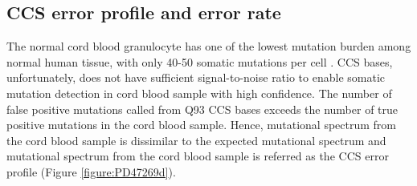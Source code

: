 
\subsection{CCS error profile and error rate}
\label{sec:CCS-error-rate}

The normal cord blood granulocyte has one of the lowest mutation burden among normal human tissue, with only 40-50 somatic mutations per cell \cite{Mitchell2022-ry}. CCS bases, unfortunately, does not have sufficient signal-to-noise ratio to enable somatic mutation detection in cord blood sample with high confidence. The number of false positive mutations called from Q93 CCS bases exceeds the number of true positive mutations in the cord blood sample. Hence, mutational spectrum from the cord blood sample is dissimilar to the expected mutational spectrum  and mutational spectrum from the cord blood sample is referred as the CCS error profile (Figure \ref{figure:PD47269d}). 

